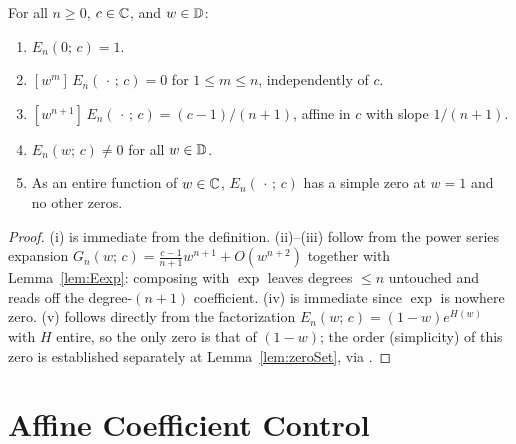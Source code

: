 \begin{lemma}
  \label{lem:structure}
  \leanok
  For all $n \ge 0$, $c \in \mathbb{C}$, and $w \in \mathbb{D}$:
  \begin{enumerate}
    \item[(i)] $E_n(0;\,c) = 1$.
    \item[(ii)] $[w^m]\,E_n(\,\cdot\,;\,c) = 0$ for $1 \le m \le n$,
      independently of $c$.
    \item[(iii)] $[w^{n+1}]\,E_n(\,\cdot\,;\,c) = (c-1)/(n+1)$, affine in
      $c$ with slope $1/(n+1)$.
    \item[(iv)] $E_n(w;\,c) \ne 0$ for all $w \in \mathbb{D}$.
    \item[(v)] As an entire function of $w \in \mathbb{C}$, $E_n(\,\cdot\,;\,c)$
      has a simple zero at $w = 1$ and no other zeros.
  \end{enumerate}
\end{lemma}
\begin{proof}
  \leanok
  (i) is immediate from the definition. (ii)--(iii) follow from the power
  series expansion $G_n(w;\,c) = \tfrac{c-1}{n+1}w^{n+1} + O(w^{n+2})$
  together with Lemma~\ref{lem:Eexp}: composing with $\exp$ leaves
  degrees $\le n$ untouched and reads off the degree-$(n+1)$ coefficient.
  (iv) is immediate since $\exp$ is nowhere zero. (v) follows directly
  from the factorization $E_n(w;\,c) = (1-w)e^{H(w)}$ with $H$ entire, so
  the only zero is that of $(1-w)$; the order (simplicity) of this zero
  is established separately at Lemma~\ref{lem:zeroSet}, via
  .
\end{proof}

\chapter{Affine Coefficient Control}
\label{chap:affine}

